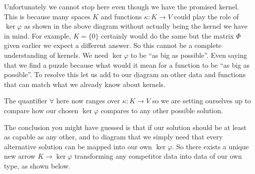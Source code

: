 \documentclass[12pt,twoside,dvipsnames,letterpaper]{memoir}
\begin{document}
Unfortunately we cannot stop here even though we have the promised kernel.
This is because many spaces $K$ and functions $\kappa:K\to V$ could play the role of
$\ker\varphi$ as shown in the above diagram without actually being the 
kernel we have in mind.  For example, $K=\{0\}$ certainly would do the same 
but the matrix $\Phi$ given earlier we expect a different answer.  So this cannot
be a complete understanding of kernels.  We need $\ker\varphi$ to be ``as big as
possible''.  Even saying that we find a puzzle because what would it mean 
for a function to be ``as big as possible''.  To resolve this let us 
add to our diagram an other data and functions that can match what we already 
know about kernels.
\begin{center}
\end{center}
The quantifier $\forall$ here now ranges over $\kappa:K\to V$ so we are 
setting ourselves up to compare how our chosen $\ker\varphi$ compares to 
any other possible solution.

The conclusion you might have guessed is that if our solution should be 
at least as capable as any other, and to diagram that we simply need that 
every alternative solution can be mapped into our own $\ker \varphi$.  So there
exists a unique new arrow $K\to \ker\varphi$ transforming any competitor data 
into data of our own type, as shown below.
\begin{center}
\end{center}
\end{document}
